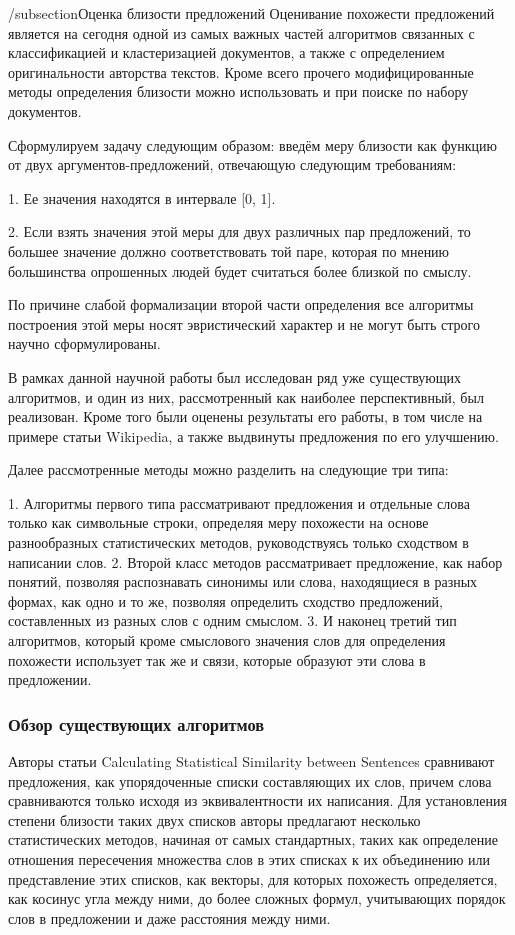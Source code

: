 /subsection{Оценка близости предложений}
Оценивание похожести предложений является на сегодня одной из самых важных
частей алгоритмов связанных с классификацией и кластеризацией документов, а также
с определением оригинальности авторства текстов. Кроме всего прочего модифицированные методы определения
близости можно использовать и при поиске по набору документов.

Сформулируем задачу следующим образом:
введём меру близости как функцию от двух аргументов-предложений, отвечающую следующим требованиям:

1. Ее значения находятся в интервале [0, 1].

2. Если взять значения этой меры для двух различных пар предложений, 
то большее значение должно соответствовать той паре, которая по мнению
большинства опрошенных людей будет считаться более близкой по смыслу.

По причине слабой формализации второй части определения все алгоритмы 
построения этой меры носят эвристический характер и не могут быть строго научно сформулированы.

В рамках данной научной работы был исследован ряд уже существующих алгоритмов,
и один из них, рассмотренный как наиболее перспективный, был реализован.
Кроме того были оценены результаты его работы, в том числе на примере статьи Wikipedia, 
а также выдвинуты предложения по его улучшению.

Далее рассмотренные методы можно разделить на следующие три типа:

1. Алгоритмы первого типа\cite{statisticalSim} рассматривают предложения и отдельные слова только как символьные строки, 
определяя меру похожести на основе разнообразных статистических методов, руководствуясь только сходством в написании слов.
2. Второй класс методов\cite{wordnetSim} рассматривает предложение, как набор понятий, позволяя распознавать синонимы 
или слова, находящиеся в разных формах, как одно и то же, позволяя определить сходство предложений, 
составленных из разных слов с одним смыслом.
3. И наконец третий тип алгоритмов\cite{weightedDep}\cite{complexSim}, который кроме смыслового значения слов для определения похожести
использует так же и связи, которые образуют эти слова в предложении.

\subsubsection{Обзор существующих алгоритмов}

Авторы статьи Calculating Statistical Similarity between Sentences\cite{statisticalSim} сравнивают предложения, 
как упорядоченные списки составляющих их слов, причем слова сравниваются только исходя из эквивалентности их написания. 
Для установления степени близости таких двух списков авторы предлагают несколько статистических методов,
начиная от самых стандартных, таких как определение отношения пересечения множества слов в этих списках к их объединению
или представление этих списков, как векторы, для которых похожесть определяется, как косинус угла между ними,
до более сложных формул, учитывающих порядок слов в предложении и даже расстояния между ними.


